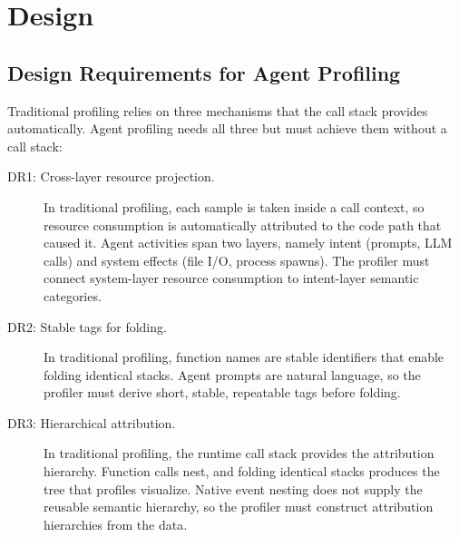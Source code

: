 \documentclass[letterpaper]{article}
\begin{document}
\section{Design}
\label{sec:design}

\subsection{Design Requirements for Agent Profiling}

Traditional profiling relies on three mechanisms that the call stack provides automatically.
Agent profiling needs all three but must achieve them without a call stack:

\begin{description}
\item[DR1: Cross-layer resource projection.]
In traditional profiling, each sample is taken inside a call context, so resource consumption is automatically attributed to the code path that caused it.
Agent activities span two layers, namely intent (prompts, LLM calls) and system
effects (file I/O, process spawns).
The profiler must connect system-layer resource consumption to intent-layer semantic categories.
\item[DR2: Stable tags for folding.]
In traditional profiling, function names are stable identifiers that enable folding identical stacks.
Agent prompts are natural language, so the profiler must derive short, stable, repeatable tags before folding.
\item[DR3: Hierarchical attribution.]
In traditional profiling, the runtime call stack provides the attribution
hierarchy. Function calls nest, and folding identical stacks produces the tree
that profiles visualize.
Native event nesting does not supply the reusable semantic hierarchy, so the
profiler must construct attribution hierarchies from the data.
\end{description}
\end{document}
